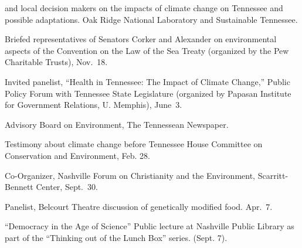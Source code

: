   and local decision makers on the impacts of climate change on Tennessee and
  possible adaptations. Oak Ridge National Laboratory and Sustainable Tennessee.
\item[2009] Briefed representatives of Senators Corker and Alexander on
  environmental aspects of the Convention on the Law of the Sea Treaty
  (organized by the Pew Charitable Trusts), Nov.~18.
\item[2009] Invited panelist, ``Health in Tennessee: The Impact of Climate
  Change,'' Public Policy Forum with Tennessee State Legislature (organized by
  Papasan Institute for Government Relations, U. Memphis), June~3.
\item[2007--2009] Advisory Board on Environment, The Tennessean Newspaper.
\item[2008] Testimony about climate change before Tennessee House Committee on
  Conservation and Environment, Feb. 28.
\item[2006] Co-Organizer, Nashville Forum on Christianity and the Environment,
  Scarritt-Bennett Center, Sept.~30.
\item[2006] Panelist, Belcourt Theatre discussion of genetically modified food.
  Apr.~7.
\item[2005] ``Democracy in the Age of Science'' Public lecture at Nashville
  Public Library as part of the ``Thinking out of the Lunch Box'' series.
  (Sept. 7).
